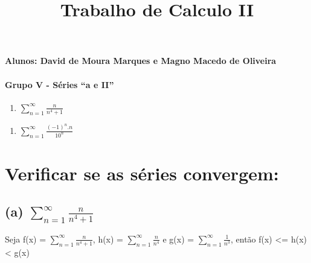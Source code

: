 \documentclass[11pt]{article}
\title{Trabalho de Calculo II}
\providecommand{\tightlist}{%
      \setlength{\itemsep}{0pt}\setlength{\parskip}{0pt}}
\begin{document}
    
    
    \maketitle
    
    

    
    \hypertarget{alunos-david-de-moura-marques-e-magno-macedo-de-oliveira}{%
\paragraph{Alunos: David de Moura Marques e Magno Macedo de
Oliveira}\label{alunos-david-de-moura-marques-e-magno-macedo-de-oliveira}}

\hypertarget{grupo-v---suxe9ries-a-e-ii}{%
\paragraph{Grupo V - Séries ``a e
II''}\label{grupo-v---suxe9ries-a-e-ii}}

\begin{enumerate}
\def\labelenumi{\alph{enumi})}
\tightlist
\item
  \(\sum_{n=1}^{\infty} \frac{n}{n^4+1}\)
\end{enumerate}

\begin{enumerate}
\def\labelenumi{\Roman{enumi})}
\setcounter{enumi}{1}
\tightlist
\item
  \(\sum_{n=1}^{\infty} \frac{(-1)^n.n}{10^n}\)
\end{enumerate}

    \hypertarget{verificar-se-as-suxe9ries-convergem}{%
\section{Verificar se as séries
convergem:}\label{verificar-se-as-suxe9ries-convergem}}

\hypertarget{a-sum_n1infty-fracnn41}{%
\subsection{\texorpdfstring{(a)
\(\sum_{n=1}^{\infty} \frac{n}{n^4+1}\)}{(a) \textbackslash{}sum\_\{n=1\}\^{}\{\textbackslash{}infty\} \textbackslash{}frac\{n\}\{n\^{}4+1\}}}\label{a-sum_n1infty-fracnn41}}

Seja f(x) = \(\sum_{n=1}^{\infty} \frac{n}{n^4+1}\), h(x) =
\(\sum_{n=1}^{\infty} \frac{n}{n^4}\) e g(x) =
\(\sum_{n=1}^{\infty} \frac{1}{n^3}\), então f(x) \textless{}= h(x)
\textless{} g(x)
\end{document}
